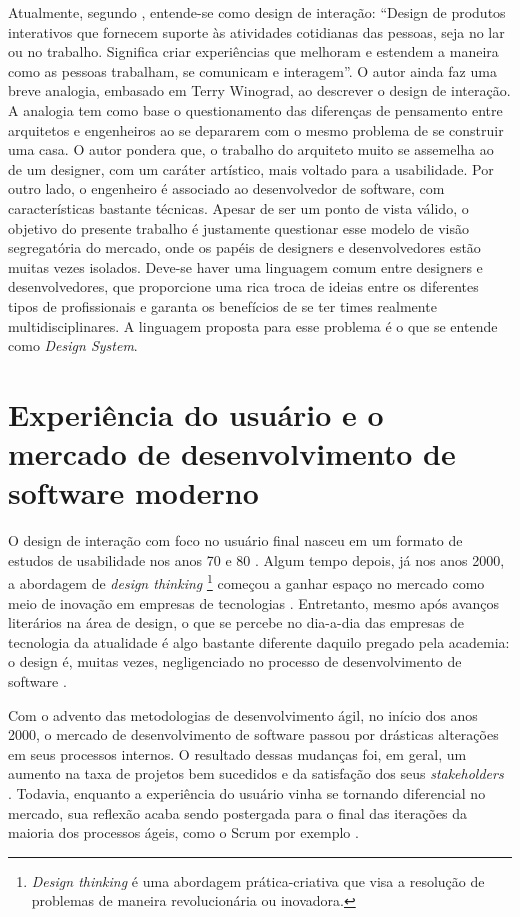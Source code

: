 Atualmente, segundo , entende-se como design de interação:
“Design de produtos interativos que fornecem suporte às atividades cotidianas das pessoas, seja no lar ou no trabalho. Significa criar experiências que melhoram e estendem a maneira como as pessoas trabalham, se comunicam e interagem”. 
O autor ainda faz uma breve analogia, embasado em Terry Winograd, ao descrever o design de interação. A analogia tem como base o questionamento das diferenças de pensamento entre arquitetos e engenheiros ao se depararem com o mesmo problema de se construir uma casa. O autor pondera que, o trabalho do arquiteto muito se assemelha ao de um designer, com um caráter artístico, mais voltado para a usabilidade. Por outro lado, o engenheiro é associado ao desenvolvedor de software, com características bastante técnicas. Apesar de ser um ponto de vista válido, o objetivo do presente trabalho é justamente questionar esse modelo de visão segregatória do mercado, onde os papéis de designers e desenvolvedores estão muitas vezes isolados. Deve-se haver uma linguagem comum entre designers e desenvolvedores, que proporcione uma rica troca de ideias entre os diferentes tipos de profissionais e garanta os benefícios de se ter times realmente multidisciplinares. A linguagem proposta para esse problema é o que se entende como \textit{Design System}.

\section{Experiência do usuário e o mercado de desenvolvimento de software moderno}
\label{experienciaUsuarioMercado}

O design de interação com foco no usuário final nasceu em um formato de estudos de usabilidade nos anos 70 e 80 \cite{gould1985designing, nielsen1994usability}. Algum tempo depois, já nos anos 2000, a abordagem de \textit{design thinking} \footnote{\textit{Design thinking} é uma abordagem prática-criativa que visa a resolução de problemas de maneira revolucionária ou inovadora.} começou a ganhar espaço no mercado como meio de inovação em empresas de tecnologias \cite{martin2009design}. Entretanto, mesmo após avanços literários na área de design, o que se percebe no dia-a-dia das empresas de tecnologia da atualidade é algo bastante diferente daquilo pregado pela academia: o design é, muitas vezes, negligenciado no processo de desenvolvimento de software \cite{ruissalo2018operating}.

Com o advento das metodologias de desenvolvimento ágil, no início dos anos 2000, o mercado de desenvolvimento de software passou por drásticas alterações em seus processos internos. O resultado dessas mudanças foi, em geral, um aumento na taxa de projetos bem sucedidos e da satisfação dos seus \textit{stakeholders} \cite{serrador2015does}. Todavia, enquanto a experiência do usuário vinha se tornando diferencial no mercado, sua reflexão acaba sendo postergada para o final das iterações da maioria dos processos ágeis, como o Scrum por exemplo \cite{ruissalo2018operating}.

